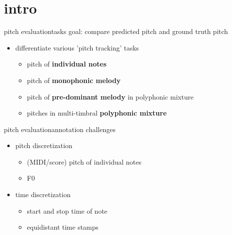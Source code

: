     \section[intro]{intro}
       \begin{frame}{pitch evaluation}{tasks}
            goal: compare predicted pitch and ground truth pitch
            \pause
            \bigskip
            \begin{itemize}
                \item   differentiate various 'pitch tracking' tasks
                    \begin{itemize}
                        \item   pitch of \textbf{individual notes}
                        \item   pitch of \textbf{monophonic melody}
                        \item   pitch of \textbf{pre-dominant melody} in polyphonic mixture
                        \item   pitches in multi-timbral \textbf{polyphonic mixture}
                    \end{itemize}
             \end{itemize}
        \end{frame}
        
       \begin{frame}{pitch evaluation}{annotation challenges}
            \begin{itemize}
               \item   pitch discretization
                    \begin{itemize}
                        \item   (MIDI/score) pitch of individual notes
                        \item   F0
                    \end{itemize}
               \item   time discretization
                    \begin{itemize}
                        \item   start and stop time of note
                        \item   equidistant time stamps
                    \end{itemize}
            \end{itemize}
            \bigskip
        \end{frame}
